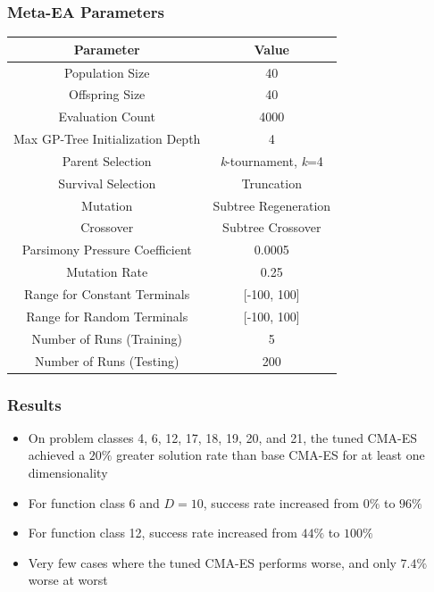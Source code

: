 \documentclass{beamer}
\begin{document}
	
	\begin{frame}
		\frametitle{Meta-EA Parameters}
		\begin{table}
			\small
			\begin{tabular}{ c | c }
				\hline
				Parameter& Value\\
				\hline
				Population Size & 40 \\
				\hline
				Offspring Size & 40\\
				\hline
				Evaluation Count & 4000\\
				\hline
				Max GP-Tree Initialization Depth & 4\\
				\hline
				Parent Selection & \textit{k}-tournament, \textit{k}=4 \\
				\hline
				Survival Selection & Truncation\\
				\hline
				Mutation & Subtree Regeneration\\
				\hline
				Crossover & Subtree Crossover\\
				\hline
				Parsimony Pressure Coefficient & 0.0005\\
				\hline
				Mutation Rate & 0.25\\
				\hline
				Range for Constant Terminals & [-100, 100]\\
				\hline
				Range for Random Terminals & [-100, 100]\\
				\hline
				Number of Runs (Training) & 5 \\
				\hline
				Number of Runs (Testing) & 200\\
				\hline	
			\end{tabular}
		\end{table}
	\end{frame}
	
	\begin{frame}
		\frametitle{Results}
			\begin{itemize}
			\item<1-|alert@1> On problem classes 4, 6, 12, 17, 18, 19, 20, and 21, the tuned CMA-ES achieved a $20\%$ greater solution rate than base CMA-ES for at least one dimensionality 
			\item<2-|alert@2> For function class 6 and $D=10$, success rate increased from $0\%$ to $96\%$
			\item<3-|alert@3> For function class 12, success rate increased from $44\%$ to $100\%$ 
			\item<4-|alert@4> Very few cases where the tuned CMA-ES performs worse, and only $7.4\%$ worse at worst			
			\end{itemize}
	\end{frame}
\end{document}
